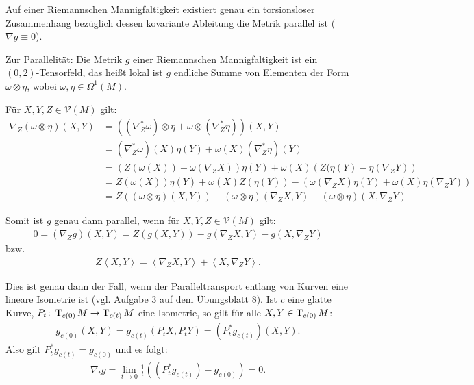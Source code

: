 \begin{Satz} \label{satz-7-12}
  Auf einer Riemannschen Mannigfaltigkeit existiert genau ein torsionsloser Zusammenhang bezüglich dessen kovariante Ableitung die Metrik parallel ist ($\nabla g \equiv 0$).
\end{Satz}

Zur Parallelität: Die Metrik $g$ einer Riemannschen Mannigfaltigkeit ist ein $(0,2)$-Tensorfeld, das heißt lokal ist $g$ endliche Summe von Elementen der Form $\omega \otimes \eta$, wobei $\omega, \eta \in \Omega^1(M)$.

Für $X,Y,Z \in \mathcal V(M)$ gilt:
\begin{align*}
  \nabla_Z(\omega \otimes \eta)(X,Y) & = \left((\nabla^{*}_Z\omega) \otimes \eta + \omega \otimes (\nabla^{*}_Z \eta)\right)(X,Y)\\
& = (\nabla^{*}_Z \omega)(X)\eta(Y) + \omega(X)(\nabla^{*}_Z \eta)(Y)\\
& = \left(Z(\omega(X)) - \omega(\nabla_ZX)\right)\eta(Y) + \omega(X)\left(Z(\eta(Y)-\eta(\nabla_ZY)\right)\\
& = Z(\omega(X))\eta(Y) + \omega(X)Z(\eta(Y)) - (\omega(\nabla_ZX)\eta(Y) + \omega(X)\eta(\nabla_ZY))\\
& = Z((\omega \otimes \eta)(X,Y)) - (\omega \otimes \eta)(\nabla_ZX,Y) - (\omega \otimes \eta)(X,\nabla_Z Y)
\end{align*}

Somit ist $g$ genau dann parallel, wenn für $X,Y,Z \in \mathcal V(M)$ gilt:
\begin{align*}
  0 = (\nabla_Z g)(X,Y) = Z(g(X,Y)) - g(\nabla_ZX,Y) - g(X,\nabla_ZY)
\end{align*}
bzw.
\begin{align*}
  Z\left<X,Y\right> = \left<\nabla_ZX,Y\right> + \left<X,\nabla_ZY\right>.
\end{align*}

Dies ist genau dann der Fall, wenn der Paralleltransport entlang von Kurven eine lineare Isometrie ist (vgl. Aufgabe 3 auf dem Übungsblatt 8).
Ist $c$ eine glatte Kurve, $P_t \colon \operatorname{T}_{c(0)}M \to \operatorname{T}_{c(t)}M$ eine Isometrie, so gilt für alle $X,Y \in \operatorname{T}_{c(0)}M$: 
\begin{align*}
  g_{c(0)}(X,Y) = g_{c(t)}(P_tX,P_tY) = (P^{*}_tg_{c(t)})(X,Y).
\end{align*}
Also gilt $P_t^{*} g_{c(t)} = g_{c(0)}$ und es folgt:
\begin{align*}
  \nabla_t g = \lim_{t \to 0}\frac{1}{t} ((P_t^{*}g_{c(t)}) - g_{c(0)}) = 0.
\end{align*}

